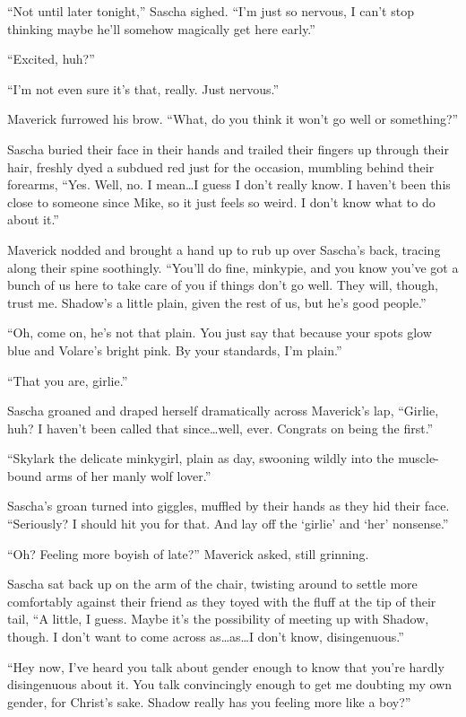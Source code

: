 ``Not until later tonight,'' Sascha sighed. ``I'm just so nervous, I can't stop thinking maybe he'll somehow magically get here early.''

``Excited, huh?''

``I'm not even sure it's that, really. Just nervous.''

Maverick furrowed his brow. ``What, do you think it won't go well or something?''

Sascha buried their face in their hands and trailed their fingers up through their hair, freshly dyed a subdued red just for the occasion, mumbling behind their forearms, ``Yes. Well, no. I mean\ldots{}I guess I don't really know. I haven't been this close to someone since Mike, so it just feels so weird. I don't know what to do about it.''

Maverick nodded and brought a hand up to rub up over Sascha's back, tracing along their spine soothingly. ``You'll do fine, minkypie, and you know you've got a bunch of us here to take care of you if things don't go well. They will, though, trust me. Shadow's a little plain, given the rest of us, but he's good people.''

``Oh, come on, he's not that plain. You just say that because your spots glow blue and Volare's bright pink. By your standards, I'm plain.''

``That you are, girlie.''

Sascha groaned and draped herself dramatically across Maverick's lap, ``Girlie, huh? I haven't been called that since\ldots{}well, ever. Congrats on being the first.''

``Skylark the delicate minkygirl, plain as day, swooning wildly into the muscle-bound arms of her manly wolf lover.''

Sascha's groan turned into giggles, muffled by their hands as they hid their face. ``Seriously? I should hit you for that. And lay off the `girlie' and `her' nonsense.''

``Oh? Feeling more boyish of late?'' Maverick asked, still grinning.

Sascha sat back up on the arm of the chair, twisting around to settle more comfortably against their friend as they toyed with the fluff at the tip of their tail, ``A little, I guess. Maybe it's the possibility of meeting up with Shadow, though. I don't want to come across as\ldots{}as\ldots{}I don't know, disingenuous.''

``Hey now, I've heard you talk about gender enough to know that you're hardly disingenuous about it. You talk convincingly enough to get me doubting my own gender, for Christ's sake. Shadow really has you feeling more like a boy?''

